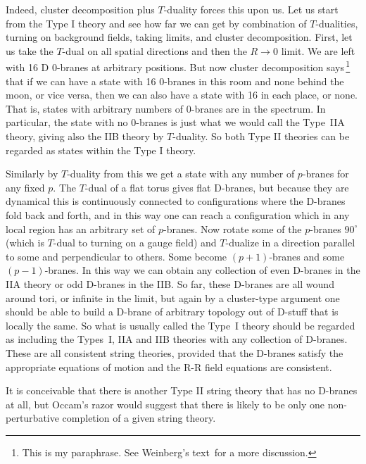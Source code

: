 \documentclass[12pt]{article}
\begin{document}
Indeed, cluster
decomposition plus $T$-duality forces this upon us.  Let us start from the
Type I theory and see how far we can get by combination of $T$-dualities,
turning on background fields, taking limits, and cluster decomposition.
First, let us take the $T$-dual on all spatial directions and then the
$R\to 0$ limit.  We are left with 16 D 0-branes at arbitrary positions. 
But now cluster decomposition says\,\footnote
{This is my paraphrase.  See Weinberg's text\, \cite{weinberg} for a more
discussion.} that if we can have a state with 16 0-branes in this room and
none behind the moon, or vice versa, then we can also have a state with 16
in each place, or none.  That is, states with arbitrary numbers of 0-branes
are in the spectrum.  In particular, the state with no 0-branes is just
what we would call the Type~IIA theory, giving also the IIB theory by
$T$-duality.  So both Type II theories can be regarded as states within the
Type I theory.

Similarly by $T$-duality from this we get a state with any number of
$p$-branes for any fixed $p$.  The $T$-dual of a
flat torus gives flat D-branes, but because they are dynamical this is
continuously connected to configurations where the D-branes fold back and
forth, and in this way one can reach a configuration which in any local
region has an arbitrary set of $p$-branes.  Now rotate some of the
$p$-branes
$90^\circ$ (which is $T$-dual to turning on a gauge field) and 
$T$-dualize in a direction parallel to some and perpendicular to others. 
Some become $(p+1)$-branes and some $(p-1)$-branes.  In this way we can
obtain any collection of even D-branes in the IIA theory or odd D-branes
in the IIB.  So far, these D-branes are all wound around tori, or infinite
in the limit, but again by a cluster-type argument one should be able to
build a D-brane of arbitrary topology out of D-stuff that is locally the
same.  So what is usually called the Type~I theory should be regarded as
including the Types~I, IIA and IIB theories with any collection of D-branes.
These are all consistent string theories, provided that the D-branes
satisfy the appropriate equations of motion and the R-R field equations
are consistent. 

It is conceivable that there is another Type II string theory that has no
D-branes at all, but Occam's razor would suggest that there is likely to be
only one non-perturbative completion of a given string theory.
\end{document}
